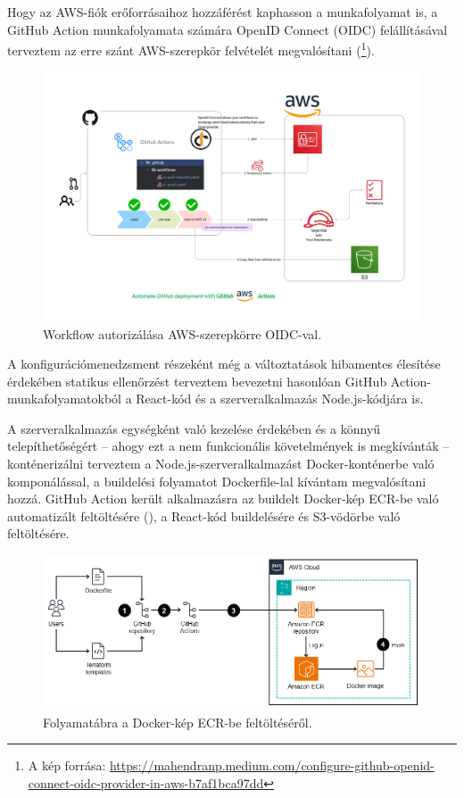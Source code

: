 Hogy az AWS-fiók erőforrásaihoz hozzáférést kaphasson a munkafolyamat is, a GitHub Action munkafolyamata számára OpenID Connect (OIDC) felállításával terveztem az erre szánt AWS-szerepkör felvételét megvalósítani (\footnote{A kép forrása: \url{https://mahendranp.medium.com/configure-github-openid-connect-oidc-provider-in-aws-b7af1bca97dd}}). \cite{githuboidc}

\begin{figure}[]
	\centering
	\includegraphics[width=150mm, keepaspectratio]{figures/githuboidc.png}
	\caption{Workflow autorizálása AWS-szerepkörre OIDC-val.}
	\label{fig:githuboidc}
\end{figure}

A konfigurációmenedzsment részeként még a változtatások hibamentes élesítése érdekében statikus ellenőrzést terveztem bevezetni hasonlóan GitHub Action-munkafolyamatokból a React-kód és a szerveralkalmazás Node.js-kódjára is.

A szerveralkalmazás egységként való kezelése érdekében és a könnyű telepíthetőségért -- ahogy ezt a nem funkcionális követelmények is megkívánták -- konténerizálni terveztem a Node.js-szerveralkalmazást Docker-konténerbe való komponálással, a buildelési folyamatot Dockerfile-lal kívántam megvalósítani hozzá. GitHub Action került alkalmazásra az buildelt Docker-kép ECR-be való automatizált feltöltésére (), a React-kód buildelésére és S3-vödörbe való feltöltésére.

\begin{figure}[]
	\centering
	\includegraphics[width=140mm, keepaspectratio]{figures/ecr.png}
	\caption{Folyamatábra a Docker-kép ECR-be feltöltéséről.}
	\label{fig:ecr}
\end{figure}

